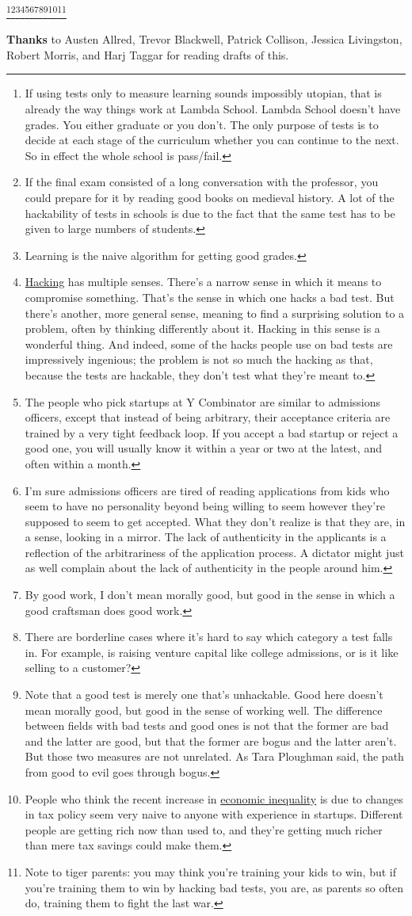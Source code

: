 \footnote{If using tests only to measure learning sounds impossibly
utopian, that is already the way things work at Lambda School. Lambda
School doesn't have grades. You either graduate or you don't. The only
purpose of tests is to decide at each stage of the curriculum whether
you can continue to the next. So in effect the whole school is
pass/fail.}\footnote{If the final exam consisted of a long conversation with the
professor, you could prepare for it by reading good books on medieval
history. A lot of the hackability of tests in schools is due to the fact
that the same test has to be given to large numbers of students.}\footnote{Learning is the naive algorithm for getting good grades.}\footnote{\href{gba.html}{Hacking} has multiple senses. There's a narrow
sense in which it means to compromise something. That's the sense in
which one hacks a bad test. But there's another, more general sense,
meaning to find a surprising solution to a problem, often by thinking
differently about it. Hacking in this sense is a wonderful thing. And
indeed, some of the hacks people use on bad tests are impressively
ingenious; the problem is not so much the hacking as that, because the
tests are hackable, they don't test what they're meant to.}\footnote{The people who pick startups at Y Combinator are similar to
admissions officers, except that instead of being arbitrary, their
acceptance criteria are trained by a very tight feedback loop. If you
accept a bad startup or reject a good one, you will usually know it
within a year or two at the latest, and often within a month.}\footnote{I'm sure admissions officers are tired of reading applications
from kids who seem to have no personality beyond being willing to seem
however they're supposed to seem to get accepted. What they don't
realize is that they are, in a sense, looking in a mirror. The lack of
authenticity in the applicants is a reflection of the arbitrariness of
the application process. A dictator might just as well complain about
the lack of authenticity in the people around him.}\footnote{By good work, I don't mean morally good, but good in the sense
in which a good craftsman does good work.}\footnote{There are borderline cases where it's hard to say which category
a test falls in. For example, is raising venture capital like college
admissions, or is it like selling to a customer?}\footnote{Note that a good test is merely one that's unhackable. Good here
doesn't mean morally good, but good in the sense of working well. The
difference between fields with bad tests and good ones is not that the
former are bad and the latter are good, but that the former are bogus
and the latter aren't. But those two measures are not unrelated. As Tara
Ploughman said, the path from good to evil goes through bogus.}\footnote{People who think the recent increase in
\href{ineq.html}{economic inequality} is due to changes in tax policy
seem very naive to anyone with experience in startups. Different people
are getting rich now than used to, and they're getting much richer than
mere tax savings could make them.}\footnote{Note to tiger parents: you may think you're training your kids
to win, but if you're training them to win by hacking bad tests, you
are, as parents so often do, training them to fight the last war.}

\textbf{Thanks} to Austen Allred, Trevor Blackwell, Patrick Collison,
Jessica Livingston, Robert Morris, and Harj Taggar for reading drafts of
this.